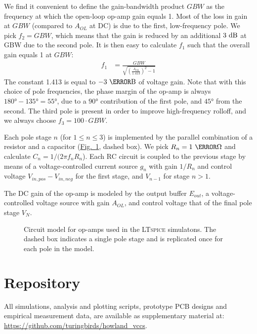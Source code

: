 \documentclass[10pt]{article}
\newcommand{\brieffiglink}[1]{\hyperref[#1]{Fig.~\ref*{#1}}}
\begin{document}
We find it convenient to define the gain-bandwidth product $GBW$ as the frequency at which the open-loop op-amp gain equals 1. Most of the loss in gain at $GBW$ (compared to $A_{OL}$ at DC) is due to the first, low-frequency pole. We pick $f_2=GBW$, which means that the gain is reduced by an additional $3~\dB$ at GBW due to the second pole. It is then easy to calculate $f_1$ such that the overall gain equals 1 at $GBW$:
\begin{align}
\label{eq:gbw_pole_freq}
f_1 &= \frac{GBW}{\sqrt{\left(\frac{A_{OL}}{1.413}\right)^2 - 1}}
\end{align}
The constant 1.413 is equal to $-3~\deci\bel$ of voltage gain. Note that with this choice of pole frequencies, the phase margin of the op-amp is always $\ang{180}-\ang{135}=\ang{55}$, due to a $\ang{90}$ contribution of the first pole, and $\ang{45}$ from the second. The third pole is present in order to improve high-frequency rolloff, and we always choose $f_3 = 100\cdot{}GBW$.

Each pole stage $n$ (for $1\leq{}n\leq{}3$) is implemented by the parallel combination of a resistor and a capacitor (\brieffiglink{fig:op_amp_model}, dashed box). We pick $R_n=1~\kilo\ohm$ and calculate $C_n=1/(2\pi{}f_nR_n$). Each RC circuit is coupled to the previous stage by means of a voltage-controlled current source $g_n$ with gain $1/R_n$ and control voltage $V_{in,pos}-V_{in,neg}$ for the first stage, and $V_{n-1}$ for stage $n>1$.

The DC gain of the op-amp is modeled by the output buffer $E_{out}$, a voltage-controlled voltage source with gain $A_{OL}$, and control voltage that of the final pole stage $V_N$.


\begin{figure}
\centering
\makebox[\textwidth][c]{%
}
\caption{\small Circuit model for op-amps used in the \textsc{LTspice} simulatons. The dashed box indicates a single pole stage and is replicated once for each pole in the model.}
\label{fig:op_amp_model}
\end{figure}


\section{Repository}
\label{sec:repo}

All simulations, analysis and plotting scripts, prototype PCB designs and empirical measurement data, are available as supplementary material at:\\
\href{https://github.com/turingbirds/howland_vccs}{https://github.com/turingbirds/howland\_vccs}.
\end{document}

